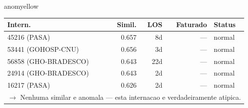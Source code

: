 \documentclass[a4paper,10pt]{article}
\begin{document}
\begin{anomalycard}[Internacao 164491 | GHO-PETROBRAS | MODERADO (z=2.49)]{anomyellow}
\begin{tabular}{l r r r l}\toprule\textbf{Intern.} & \textbf{Simil.} & \textbf{LOS} & \textbf{Faturado} & \textbf{Status} \\\midrule
45216 (PASA) & 0.657 & 8d & --- & \textcolor{jcubeblue}{normal} \\
53441 (GOHOSP-CNU) & 0.656 & 3d & --- & \textcolor{jcubeblue}{normal} \\
56858 (GHO-BRADESCO) & 0.643 & 22d & --- & \textcolor{jcubeblue}{normal} \\
24914 (GHO-BRADESCO) & 0.643 & 2d & --- & \textcolor{jcubeblue}{normal} \\
16217 (PASA) & 0.626 & 2d & --- & \textcolor{jcubeblue}{normal} \\
\multicolumn{5}{l}{\textcolor{jcubeblue}{\small $\rightarrow$ Nenhuma similar e anomala --- esta internacao e verdadeiramente atipica.}} \\
\bottomrule\end{tabular}



\end{anomalycard}

\newpage
\end{document}
